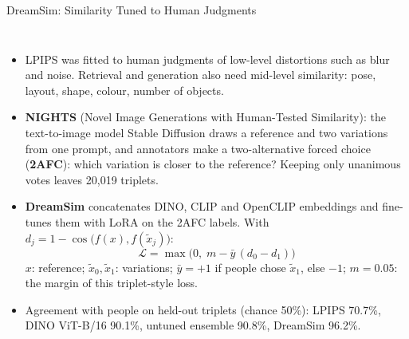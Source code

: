 \begin{frame}{DreamSim: Similarity Tuned to Human Judgments}
  \begin{columns}[T,onlytextwidth]
      \begin{itemize}\scriptsize\itemsep0.22em
        \item LPIPS was fitted to human judgments of low-level distortions such as blur and noise. Retrieval and generation also need mid-level similarity: pose, layout, shape, colour, number of objects.
        \item \textbf{NIGHTS} (Novel Image Generations with Human-Tested Similarity): the text-to-image model Stable Diffusion draws a reference and two variations from one prompt, and annotators make a two-alternative forced choice (\textbf{2AFC}): which variation is closer to the reference? Keeping only unanimous votes leaves 20{,}019 triplets.
        \item \textbf{DreamSim} concatenates DINO, CLIP and OpenCLIP embeddings and fine-tunes them with LoRA on the 2AFC labels. With $d_j = 1 - \cos\big(f(x), f(\tilde{x}_j)\big)$:
        \[ \mathcal{L} = \max\big(0,\; m - \bar{y}\,(d_0 - d_1)\big) \]
        $x$: reference; $\tilde{x}_0, \tilde{x}_1$: variations; $\bar{y} = +1$ if people chose $\tilde{x}_1$, else $-1$; $m = 0.05$: the margin of this triplet-style loss.
        \item Agreement with people on held-out triplets (chance 50\%): LPIPS 70.7\%, DINO ViT-B/16 90.1\%, untuned ensemble 90.8\%, DreamSim 96.2\%.
      \end{itemize}
      \centering
      \vspace{0.3em}
\end{columns}
\end{frame}
